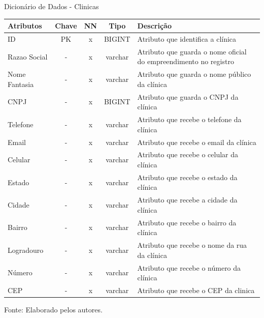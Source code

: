 \documentclass[
    12pt,               %
    openright,          %
    oneside,
    a4paper,            %
    BIBLATEX,           %
    TODO,               %
    english,            %
    brazil              %
    ]{ifsp-spo-inf-ctds}
\begin{document}
      \begin{center}
      \begin{quadro}[H]
      \centering
          \caption{Dicionário de Dados - Clinicas}
          \begin{tabulary}{1.0\textwidth}{|p{9em}|c|c|c|p{19em}|}
        \hline
        Atributos & Chave & NN & Tipo & Descrição\\
        \hline
        ID & PK & x & BIGINT & Atributo que identifica a clínica \\
        \hline
        Razao Social & - & x & varchar & Atributo que guarda o nome oficial do empreendimento no registro\\
        \hline
        Nome Fantasia & - & x & varchar & Atributo que guarda o nome público da clínica\\
        \hline
        CNPJ & - & x & BIGINT & Atributo que guarda o CNPJ da clínica \\
        \hline
        Telefone & - & x & varchar & Atributo que recebe o telefone da clínica\\
        \hline
        Email & - & x & varchar & Atributo que recebe o email da clínica\\
        \hline
        Celular & - & x & varchar & Atributo que recebe o celular da clínica \\
        \hline
        Estado & - & x & varchar & Atributo que recebe o estado da clínica\\
        \hline
        Cidade & - & x & varchar & Atributo que recebe a cidade da clínica \\
        \hline
        Bairro & - & x & varchar & Atributo que recebe o bairro da clínica \\
        \hline
        Logradouro & - & x & varchar & Atributo que recebe o nome da rua da clínica\\
        \hline
        Número & - & x & varchar & Atributo que recebe o número da clínica \\
        \hline
        CEP & - & x & varchar &  Atributo que recebe o CEP da clinica\\
        \hline
        \end{tabulary}
         
          \label{qd: md-clinica}
          \centering
        {\footnotesize Fonte: Elaborado pelos autores.}
      \end{quadro}
    \end{center}
\end{document}
